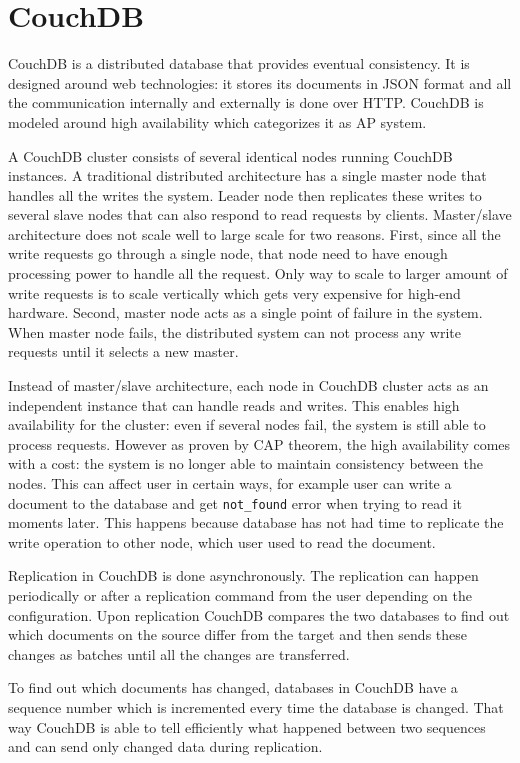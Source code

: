 \section{CouchDB}

CouchDB is a distributed database that provides eventual
consistency\cite{anderson2010couchdb}. It is designed around web technologies:
it stores its documents in JSON format and all the communication internally and
externally is done over HTTP\@. CouchDB is modeled around high availability
which categorizes it as AP system.

A CouchDB cluster consists of several identical nodes running CouchDB instances.
A traditional distributed architecture has a single master node that handles all
the writes the system. Leader node then replicates these writes to several
slave nodes that can also respond to read requests by clients. Master/slave
architecture does not scale well to large scale for two reasons. First, since
all the write requests go through a single node, that node need to have enough
processing power to handle all the request. Only way to scale to larger amount
of write requests is to scale vertically which gets very expensive for high-end
hardware. Second, master node acts as a single point of failure in the system.
When master node fails, the distributed system can not process any write
requests until it selects a new master.

Instead of master/slave architecture, each node in CouchDB cluster acts as an
independent instance that can handle reads and writes. This enables high
availability for the cluster: even if several nodes fail, the system is still
able to process requests. However as proven by CAP theorem, the high
availability comes with a cost: the system is no longer able to maintain
consistency between the nodes. This can affect user in certain ways, for example
user can write a document to the database and get \texttt{not\_found} error when
trying to read it moments later. This happens because database has not had time
to replicate the write operation to other node, which user used to read the
document.

Replication in CouchDB is done asynchronously. The replication can happen
periodically or after a replication command from the user depending on the
configuration. Upon replication CouchDB compares the two databases to find out
which documents on the source differ from the target and then sends these
changes as batches until all the changes are transferred.

To find out which documents has changed, databases in CouchDB have a sequence
number which is incremented every time the database is changed. That way CouchDB
is able to tell efficiently what happened between two sequences and can send
only changed data during replication.

